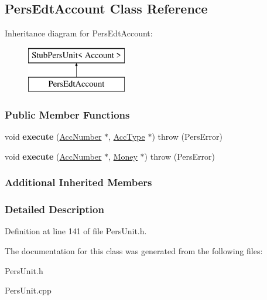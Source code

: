 \hypertarget{classPersEdtAccount}{\subsection{Pers\-Edt\-Account Class Reference}
\label{d9/d3d/classPersEdtAccount}
}
Inheritance diagram for Pers\-Edt\-Account\-:\begin{figure}[H]
\begin{center}
\leavevmode
\includegraphics[height=2.000000cm]{d9/d3d/classPersEdtAccount}
\end{center}
\end{figure}
\subsubsection*{Public Member Functions}
\begin{DoxyCompactItemize}
\item 
\hypertarget{classPersEdtAccount_ad6ee8ffd77bd4e6e169c2cc1aca39619}{void {\bfseries execute} (\hyperlink{classAccNumber}{Acc\-Number} $\ast$, \hyperlink{classUsrType}{Acc\-Type} $\ast$)  throw (\-Pers\-Error)}\label{d9/d3d/classPersEdtAccount_ad6ee8ffd77bd4e6e169c2cc1aca39619}

\item 
\hypertarget{classPersEdtAccount_aacdc72e8ee1842be9516d0a17c043460}{void {\bfseries execute} (\hyperlink{classAccNumber}{Acc\-Number} $\ast$, \hyperlink{classMoney}{Money} $\ast$)  throw (\-Pers\-Error)}\label{d9/d3d/classPersEdtAccount_aacdc72e8ee1842be9516d0a17c043460}

\end{DoxyCompactItemize}
\subsubsection*{Additional Inherited Members}


\subsubsection{Detailed Description}


Definition at line 141 of file Pers\-Unit.\-h.



The documentation for this class was generated from the following files\-:\begin{DoxyCompactItemize}
\item 
Pers\-Unit.\-h\item 
Pers\-Unit.\-cpp\end{DoxyCompactItemize}
